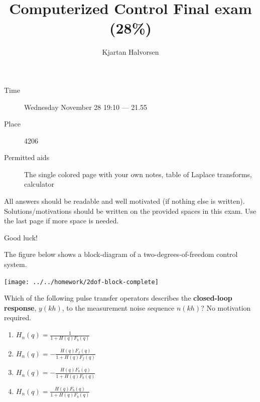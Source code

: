 \documentclass[letterpaper,12pt]{scrartcl}
\title{Computerized Control Final exam (28\%)}
\author{Kjartan Halvorsen}
\date{}
\newenvironment{exercise}[1][Problem]{\begin{trivlist} \item[\hskip
    \labelsep {\stepcounter{exerctr}\bfseries #1
      \arabic{exerctr}}]}{\end{trivlist}\vspace{10mm}}
\newcounter{exerctr}
\newcommand{\bmpl}{\begin{minipage}[t]{\textwidth}}
\newcommand{\emp}{\end{minipage}}
\begin{document}
\maketitle


\begin{description}
\item[Time] Wednesday November 28 19:10 --- 21.55
\item[Place] 4206
\item[Permitted aids] The single colored page with your own notes, table of Laplace transforms, calculator
\end{description}

All answers should be readable and well motivated (if nothing else is written). Solutions/motivations should be written on the provided spaces in this exam. Use the last page if more space is needed.

\begin{center}
{\Large Good luck!} \\
\end{center}

\noindent
\fbox{
\bmpl%
{\bf Matricula and name:}\\
\vspace*{18mm}
\emp}


\clearpage

\begin{exercise}

The figure below shows a block-diagram of a two-degrees-of-freedom control system. 
\begin{center}
\texttt{[image: ../../homework/2dof-block-complete]}
\end{center}

Which of the following pulse transfer operators describes the \textbf{closed-loop response}, $y(kh)$, to the measurement noise sequence $n(kh)$? No motivation required.
\begin{enumerate}
\item \( H_n(q) = \frac{1}{1 + H(q)F_b(q)} \)
\item \( H_n(q) = -\frac{H(q)F_f(q)}{1 + H(q)F_f(q)} \)
\item \( H_n(q) = -\frac{H(q)F_b(q)}{1 + H(q)F_b(q)} \)
\item \( H_n(q) = \frac{H(q)F_b(q)}{1 + H(q)F_b(q)} \)
\end{enumerate}

\end{exercise}
\end{document}
